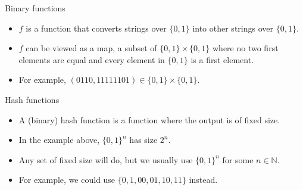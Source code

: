 \begin{frame}{Binary functions}

  \begin{itemize}
    \item $f$ is a function that converts strings over $\{0,1\}$ into other strings over $\{0,1\}$.
    \item $f$ can be viewed as a map, a subset of $\{0,1\} \times \{0,1\}$ where no two first elements are equal and every element in $\{0,1\}$ is a first element.
    \item For example, $(0110,11111101) \in \{0,1\} \times \{0,1\}$.
  \end{itemize}
\end{frame}


\begin{frame}{Hash functions}

  \begin{itemize}
    \item A (binary) hash function is a function where the output is of fixed size.
    \item In the example above, $\{0,1\}^n$ has size $2^n$.
    \item Any set of fixed size will do, but we usually use $\{0,1\}^n$ for some $n \in \mathbb{N}$.
    \item For example, we could use $\{0, 1, 00, 01, 10, 11\}$ instead.
  \end{itemize}
\end{frame}

